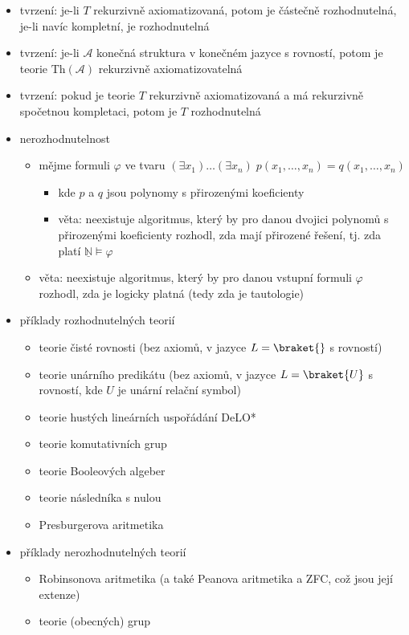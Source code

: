 \begin{itemize}
\begin{itemize}
\begin{itemize}
\item řekneme, že teorie $T$ má rekurzivně spočetnou kompletaci, pokud (nějaká) množina (až na ekvivalenci) všech jednoduchých kompletních extenzí teorie $T$ je rekurzivně spočetná, tj. existuje algoritmus, který pro danou vstupní dvojici přirozených čísel $(i,j)$ vypíše na výstup $i$-tý axiom $j$-té extenze (v nějakém pevně daném uspořádání), nebo odpoví, že takový axiom už neexistuje
\end{itemize}
\item tvrzení: je-li $T$ rekurzivně axiomatizovaná, potom je částečně rozhodnutelná, je-li navíc kompletní, je rozhodnutelná
\item tvrzení: je-li $\mathcal A$ konečná struktura v konečném jazyce s rovností, potom je teorie $\text{Th}(\mathcal A)$ rekurzivně axiomatizovatelná
\item tvrzení: pokud je teorie $T$ rekurzivně axiomatizovaná a má rekurzivně spočetnou kompletaci, potom je $T$ rozhodnutelná
\item nerozhodnutelnost
\begin{itemize}
\item mějme formuli $\varphi$ ve tvaru $(\exists x_1)\dots(\exists x_n) \;p(x_1,\dots,x_n)=q(x_1,\dots,x_n)$
\begin{itemize}
\item kde $p$ a $q$ jsou polynomy s přirozenými koeficienty
\item věta: neexistuje algoritmus, který by pro danou dvojici polynomů s přirozenými koeficienty rozhodl, zda mají přirozené řešení, tj. zda platí $\underline{\mathbb N}\vDash\varphi$
\end{itemize}
\item věta: neexistuje algoritmus, který by pro danou vstupní formuli $\varphi$ rozhodl, zda je logicky platná (tedy zda je tautologie)
\end{itemize}
\item příklady rozhodnutelných teorií
\begin{itemize}
\item teorie čisté rovnosti (bez axiomů, v jazyce $L=\braket{}$ s rovností)
\item teorie unárního predikátu (bez axiomů, v jazyce $L=\braket{U}$ s rovností, kde $U$ je unární relační symbol)
\item teorie hustých lineárních uspořádání DeLO*
\item teorie komutativních grup
\item teorie Booleových algeber
\item teorie následníka s nulou
\item Presburgerova aritmetika
\end{itemize}
\item příklady nerozhodnutelných teorií
\begin{itemize}
\item Robinsonova aritmetika (a také Peanova aritmetika a ZFC, což jsou její extenze)
\item teorie (obecných) grup
\end{itemize}
\end{itemize}
\end{itemize}
